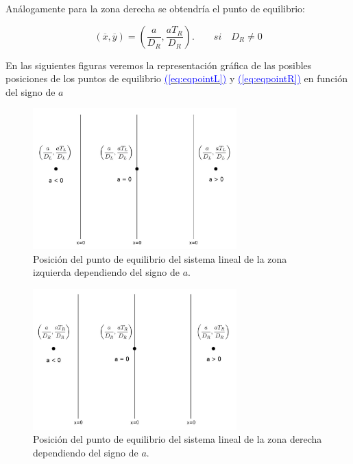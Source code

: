 \documentclass[12pt,a4paper]{report} %
\newcommand{\eref}[1]{\hyperref[#1]{\textcolor{blue}{(\ref*{#1})}}}
\newcommand{\eref}[1]{\hyperref[#1]{\textcolor{blue}{\textit{(\ref*{#1})}}}}
\begin{document}
		\vspace{0.5cm}\noindent Análogamente para la zona derecha se obtendría el punto de equilibrio:
		
		\begin{equation}
			\label{eq:eqpointR}
			\left( \overline{x},\overline{y} \right)=\left( \frac{a}{D_R},\frac{aT_R}{D_R} \right). \qquad si \quad D_R\neq0
		\end{equation}\smallskip
		
		\newpage
		
		En las siguientes figuras veremos la representación gráfica de las posibles posiciones de los puntos de equilibrio \eref{eq:eqpointL} y \eref{eq:eqpointR} en función del signo de $a$
		
		\begin{figure}[h]
			\centering
			\includegraphics[width=0.7\textwidth,center]{punto.jpg}
			\caption{Posición del punto de equilibrio del sistema lineal de la zona izquierda dependiendo del signo de $a$.}
			\label{fig:punto}
		\end{figure}\smallskip
		

		\begin{figure}[h]
			\includegraphics[width=0.7\textwidth,center]{puntoR.jpg}
			\caption{Posición del punto de equilibrio del sistema lineal de la zona derecha dependiendo del signo de $a$.}
			\label{fig:puntoR}
		\end{figure}
\end{document}
